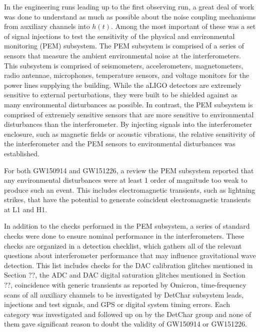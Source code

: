 In the engineering runs leading up to the first observing run, a great deal of 
work was done to understand as much as possible about the noise coupling mechanisms 
from auxiliary channels into $h(t)$. Among the most important of these was a set 
of signal injections to test the sensitivity of the physical and environmental 
monitoring (PEM) subsystem. The PEM subsystem is comprised of a series of sensors 
that measure the ambient environmental noise at the interferometers. This 
subsystem is comprised of seismometers, accelerometers, magnetometers, radio 
antennae, microphones, temperature sensors, and voltage monitors for the power 
lines supplying the building. While the aLIGO detectors are extremely sensitive 
to external perturbations, they were built to be shielded against as many 
environmental disturbances as possible. In contrast, the PEM subsystem is comprised 
of extremely sensitive sensors that are more sensitive to environmental disturbances 
than the interferometer. By injecting signals into the interferometer enclosure, 
such as magnetic fields or acoustic vibrations, the relative sensitivity of the 
interferometer and the PEM sensors to environmental disturbances was established.

For both GW150914 and GW151226, a review the PEM subsystem reported that any environmental 
disturbances were at least 1 order of magnitude too weak to produce such an event. 
This includes electromagnetic transients, such as lightning strikes, that have the 
potential to generate coincident electromagnetic transients at L1 and H1. 

In addition to the checks performed in the PEM subsystem, a series of standard 
checks were done to ensure nominal performance in the interferometers. These 
checks are organized in a detection checklist, which gathers all of the 
relevant questions about interferometer performance that may influence 
gravitational wave detection. This list includes checks 
for the DAC calibration glitches mentioned in Section ??, the ADC and DAC 
digital saturation glitches mentioned in Section ??, coincidence with 
generic transients 
as reported by Omicron, time-frequency scans of all auxiliary channels to be 
investigated by DetChar subsystem leads, injections and test signals, and 
GPS or digital system timing errors. Each category was investigated and 
followed up on by the DetChar group and none of them gave significant 
reason to doubt the validity of GW150914 or GW151226.  

